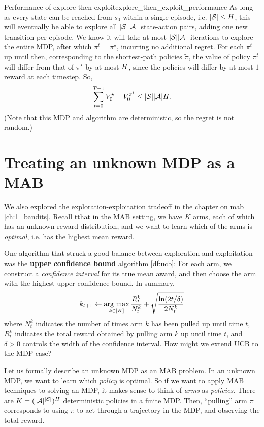 \documentclass[\main/main]{subfiles}
\begin{document}
\begin{theorem}{Performance of explore-then-exploit}{explore_then_exploit_performance}
    As long as every state can be reached from $s_0$ within a single episode, i.e. $|\mathcal{S}| \le H$, this will eventually be able to explore all $|\mathcal{S}| |\mathcal{A}|$ state-action pairs, adding one new transition per episode.
    We know it will take at most $|\mathcal{S}| |\mathcal{A}|$ iterations to explore the entire MDP, after which $\pi^t = \pi^\star$, incurring no additional regret.
    For each $\pi^t$ up until then, corresponding to the shortest-path policies $\tilde \pi$, the value of policy $\pi^t$ will differ from that of $\pi^\star$ by at most $H$, since the policies will differ by at most $1$ reward at each timestep.
    So,
    \[
        \sum_{t=0}^{T-1} V^\star_0 - V_0^{\pi^t} \le |\mathcal{S}||\mathcal{A}| H.
    \]
    (Note that this MDP and algorithm are deterministic, so the regret is not random.)
\end{theorem}



\section{Treating an unknown MDP as a MAB}
\label{sec:mdp_mab}

We also explored the exploration-exploitation tradeoff in the chapter on \acrlong{mab} \eqref{ch:1_bandits}.
Recall tthat in the MAB setting, we have $K$ arms, each of which has an unknown reward distribution,
and we want to learn which of the arms is \emph{optimal}, i.e. has the highest mean reward.

One algorithm that struck a good balance between exploration and exploitation was the \textbf{upper confidence bound} algorithm \eqref{df:ucb}: For each arm, we construct a \emph{confidence interval} for its true mean award, and then choose the arm with the highest upper confidence bound. In summary,
\[k_{t+1} \gets \operatorname*{\textrm{arg\ max}}_{k \in [K]} \frac{R^{k}_t}{N^{k}_t} + \sqrt{\frac{\ln(2t/\delta)}{2 N^{k}_t}}\]
where $N_t^k$ indicates the number of times arm $k$ has been pulled up until time $t$,
$R_t^k$ indicates the total reward obtained by pulling arm $k$ up until time $t$,
and $\delta > 0$ controls the width of the confidence interval.
How might we extend UCB to the MDP case?

Let us formally describe an unknown MDP as an MAB problem.
In an unknown MDP, we want to learn which \emph{policy} is optimal. So if we want to apply MAB techniques to solving an MDP, it makes sense to think of \emph{arms} as \emph{policies}.
There are $K = (|\mathcal{A}|^{|\mathcal{S}|})^H$ deterministic policies in a finite MDP.
Then, ``pulling'' arm $\pi$ corresponds to using $\pi$ to act through a trajectory in the MDP, and observing the total reward.
\end{document}

